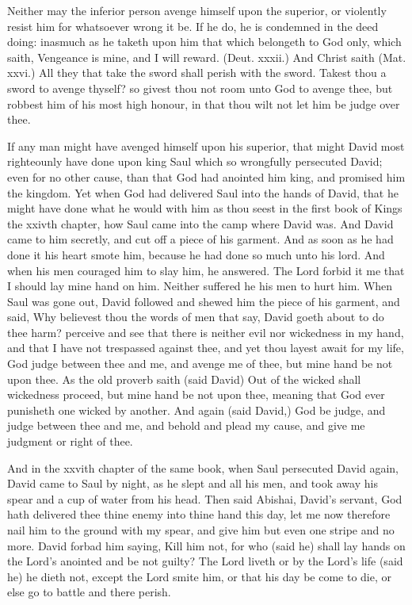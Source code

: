 Neither may the inferior person avenge himself upon 
the superior, or violently resist him for whatsoever wrong 
it be. If he do, he is condemned in the deed doing: 
inasmuch as he taketh upon him that which belongeth to 
God only, which saith, Vengeance is mine, and I will reward.
(Deut. xxxii.) And Christ saith (Mat. xxvi.) All 
they that take the sword shall perish with the sword. 
Takest thou a sword to avenge thyself? so givest thou not 
room unto God to avenge thee, but robbest him of his 
most high honour, in that thou wilt not let him be judge 
over thee. 

If any man might have avenged himself upon his superior,
that might David most righteounly have done upon
king Saul which so wrongfully persecuted David; even 
for no other cause, than that God had anointed him king, 
and promised him the kingdom. Yet when God had delivered
Saul into the hands of David, that he might have 
done what he would with him as thou seest in the first book 
of Kings the xxivth chapter, how Saul came into the camp 
where David was. And David came to him secretly, and 
cut off a piece of his garment. And as soon as he had 
done it his heart smote him, because he had done so much 
unto his lord. And when his men couraged him to slay 
him, he answered. The Lord forbid it me that I should 
lay mine hand on him. Neither suffered he his men to 
hurt him. When Saul was gone out, David followed and 
shewed him the piece of his garment, and said, Why believest
thou the words of men that say, David goeth about 
to do thee harm? perceive and see that there is neither 
evil nor wickedness in my hand, and that I have not trespassed
against thee, and yet thou layest await for my life, 
God judge between thee and me, and avenge me of thee, 
but mine hand be not upon thee. As the old proverb saith 
(said David) Out of the wicked shall wickedness proceed, 
but mine hand be not upon thee, meaning that God ever 
punisheth one wicked by another. And again (said David,) 
God be judge, and judge between thee and me, and 
behold and plead my cause, and give me judgment or right 
of thee. 

And in the xxvith chapter of the same book, when Saul 
persecuted David again, David came to Saul by night, 
as he slept and all his men, and took away his spear and a 
cup of water from his head. Then said Abishai, David's
servant, God hath delivered thee thine enemy into thine 
hand this day, let me now therefore nail him to the ground 
with my spear, and give him but even one stripe and no 
more. David forbad him saying, Kill him not, for who 
(said he) shall lay hands on the Lord's anointed and be 
not guilty? The Lord liveth or by the Lord's life (said he) 
he dieth not, except the Lord smite him, or that his day be 
come to die, or else go to battle and there perish.

